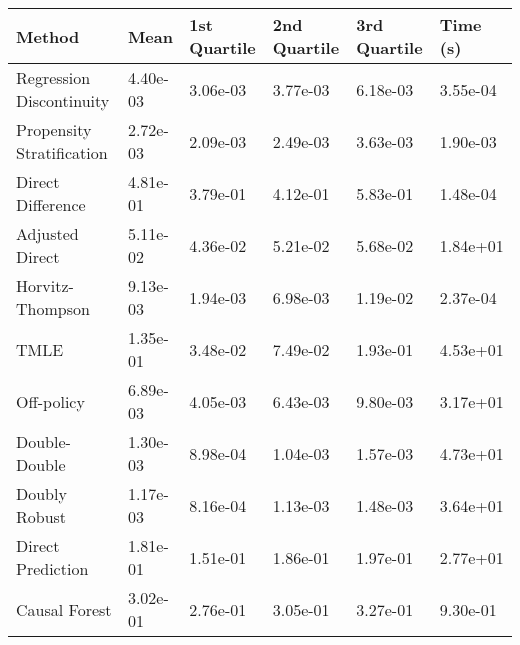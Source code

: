 \begin{tabular}{llllll}
  \toprule
  \textbf{Method} & \textbf{Mean} & \textbf{1st Quartile} & \textbf{2nd Quartile} & \textbf{3rd Quartile} & \textbf{Time (s)} \\ \midrule 
Regression Discontinuity & 4.40e-03 & 3.06e-03 & 3.77e-03 & 6.18e-03 & \cellcolor{bronze!60}3.55e-04\\
Propensity Stratification & \cellcolor{bronze!60}2.72e-03 & 2.09e-03 & \cellcolor{bronze!60}2.49e-03 & \cellcolor{bronze!60}3.63e-03 & 1.90e-03\\
Direct Difference & 4.81e-01 & 3.79e-01 & 4.12e-01 & 5.83e-01 & \cellcolor{gold!60}1.48e-04\\
Adjusted Direct & 5.11e-02 & 4.36e-02 & 5.21e-02 & 5.68e-02 & 1.84e+01\\
Horvitz-Thompson & 9.13e-03 & \cellcolor{bronze!60}1.94e-03 & 6.98e-03 & 1.19e-02 & \cellcolor{silver!60}2.37e-04\\
TMLE & 1.35e-01 & 3.48e-02 & 7.49e-02 & 1.93e-01 & 4.53e+01\\
Off-policy & 6.89e-03 & 4.05e-03 & 6.43e-03 & 9.80e-03 & 3.17e+01\\
Double-Double & \cellcolor{silver!60}1.30e-03 & \cellcolor{silver!60}8.98e-04 & \cellcolor{gold!60}1.04e-03 & \cellcolor{silver!60}1.57e-03 & 4.73e+01\\
Doubly Robust & \cellcolor{gold!60}1.17e-03 & \cellcolor{gold!60}8.16e-04 & \cellcolor{silver!60}1.13e-03 & \cellcolor{gold!60}1.48e-03 & 3.64e+01\\
Direct Prediction & 1.81e-01 & 1.51e-01 & 1.86e-01 & 1.97e-01 & 2.77e+01\\
Causal Forest & 3.02e-01 & 2.76e-01 & 3.05e-01 & 3.27e-01 & 9.30e-01\\
\bottomrule
\end{tabular}